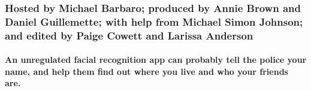 \hypertarget{hosted-by-michael-barbaro-produced-by-annie-brown-and-daniel-guillemette-with-help-from-michael-simon-johnson-and-edited-by-paige-cowett-and-larissa-anderson}{%
\subsubsection{Hosted by Michael Barbaro; produced by Annie Brown and
Daniel Guillemette; with help from Michael Simon Johnson; and edited by
Paige Cowett and Larissa
Anderson}\label{hosted-by-michael-barbaro-produced-by-annie-brown-and-daniel-guillemette-with-help-from-michael-simon-johnson-and-edited-by-paige-cowett-and-larissa-anderson}}

\hypertarget{an-unregulated-facial-recognition-app-can-probably-tell-the-police-your-name-and-help-them-find-out-where-you-live-and-who-your-friends-are}{%
\paragraph{An unregulated facial recognition app can probably tell the
police your name, and help them find out where you live and who your
friends
are.}\label{an-unregulated-facial-recognition-app-can-probably-tell-the-police-your-name-and-help-them-find-out-where-you-live-and-who-your-friends-are}}

